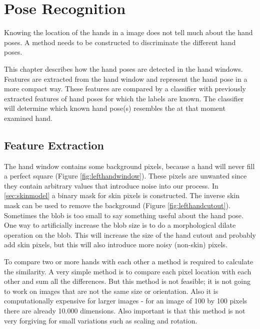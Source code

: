 
\chapter{Pose Recognition}
\label{ch:gestures}

Knowing the location of the hands in a image does not tell much about the hand poses. A method needs to be constructed to discriminate the different hand poses.

This chapter describes how the hand poses are detected in the hand windows. Features are extracted from the hand window and represent the hand pose in a more compact way. These features are compared by a classifier with previously extracted features of hand poses for which the labels are known. The classifier will determine which known hand pose(s) resembles the at that moment examined hand.


\section{Feature Extraction}
The hand window contains some background pixels, because a hand will never fill a perfect square (Figure \autoref{fig:lefthandwindow}). These pixels are unwanted since they contain arbitrary values that introduce noise into our process. In \autoref{sec:skinmodel} a binary mask for skin pixels is constructed. The inverse skin mask can be used  to remove the background (Figure \autoref{fig:lefthandcutout}). Sometimes the blob is too small to say something useful about the hand pose. One way to artificially increase the blob size is to do a morphological dilate operation on the blob. This will increase the size of the hand cutout and probably add skin pixels, but this will also introduce more noisy (non-skin) pixels.

To compare two or more hands with each other a method is required to calculate the similarity. A very simple method is to compare each pixel location with each other and sum all the differences. But this method is not feasible; it is not going to work on images that are not the same size or orientation. Also it is computationally expensive for larger images - for an image of 100 by 100 pixels there are already 10.000 dimensions. Also important is that this method is not very forgiving for small variations such as scaling and rotation.


